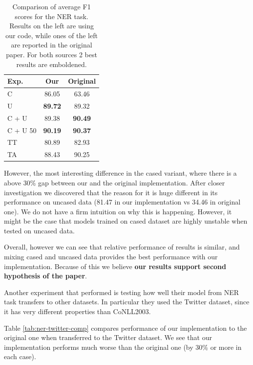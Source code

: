 \documentclass[11pt,a4paper]{article}
\begin{document}
    \begin{table}[h]
        \centering
        \begin{tabular}{|l|c|c|}
            \hline
            Exp. & Our & Original \\
            \hline
            C        & 86.05          & 63.46 \\
            U        & \textbf{89.72} & 89.32 \\
            C + U    & 89.38          & \textbf{90.49} \\
            C + U 50 & \textbf{90.19} & \textbf{90.37} \\
            TT       & 80.89          & 82.93 \\
            TA       & 88.43          & 90.25 \\
            \hline
        \end{tabular}
        \caption{Comparison of average F1 scores for the NER task. Results on the left are using our code, while ones of the left are reported in the original paper. For both sources 2 best results are emboldened.}
        \label{tab:ner-results-comp}
    \end{table}

    However, the most interesting difference in the cased variant, where there is a above 30\% gap between our and the original implementation. After closer investigation we discovered that the reason for it is huge different in its performance on uncased data (81.47 in our implementation vs 34.46 in original one). We do not have a firm intuition on why this is happening. However, it might be the case that models trained on cased dataset are highly unstable when tested on uncased data.

    Overall, however we can see that relative performance of results is similar, and mixing cased and uncased data provides the best performance with our implementation. Because of this we believe \textbf{our results support second hypothesis of the paper}.

    Another experiment that \cite{ner-and-pos-original} performed is testing how well their model from NER task transfers to other datasets. In particular they used the Twitter dataset, since it has very different properties than CoNLL2003.

    Table \ref{tab:ner-twitter-comp} compares performance of our implementation to the original one when transferred to the Twitter dataset. We see that our implementation performs much worse than the original one (by 30\% or more in each case).
\end{document}
